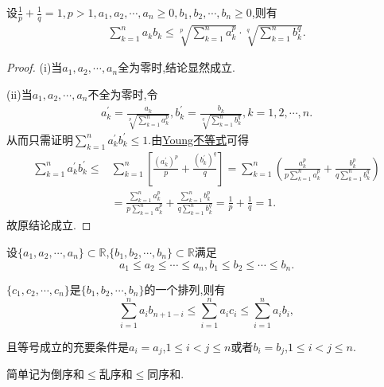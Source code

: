 \documentclass[../../main.tex]{subfiles}
\begin{document}
\begin{theorem}[Hold不等式]\label{theorem:Hold不等式}
设$\frac{1}{p}+\frac{1}{q}=1,p>1,a_1,a_2,\cdots,a_n\geqslant 0,b_1,b_2,\cdots,b_n\geqslant 0$,则有
\begin{align*}
\sum\limits_{k=1}^n{a_kb_k}\le \sqrt[p]{\sum\limits_{k=1}^n{a_{k}^{p}}}\cdot \sqrt[q]{\sum\limits_{k=1}^n{b_{k}^{q}}}.
\end{align*}
\end{theorem}
\begin{proof}
(i)当$a_1,a_2,\cdots,a_n$全为零时,结论显然成立.

(ii)当$a_1,a_2,\cdots,a_n$不全为零时,令
\begin{align*}
a_{k}^{\prime}=\frac{a_k}{\sqrt[p]{\sum\limits_{k=1}^n{a_{k}^{p}}}},b_{k}^{\prime}=\frac{b_k}{\sqrt[q]{\sum\limits_{k=1}^n{b_{k}^{q}}}},k=1,2,\cdots,n.
\end{align*}
从而只需证明$\sum\limits_{k=1}^n{a_{k}^{\prime}b_{k}^{\prime}}\leqslant 1$.由\hyperref[theorem:Young不等式]{Young不等式}可得
\begin{align*}
\sum\limits_{k=1}^n{a_{k}^{\prime}b_{k}^{\prime}}\leqslant &\sum\limits_{k=1}^n{\left[ \frac{\left( a_{k}^{\prime} \right) ^p}{p}+\frac{\left( b_{k}^{\prime} \right) ^q}{q} \right]}=\sum\limits_{k=1}^n{\left( \frac{a_{k}^{p}}{p\sum\limits_{k=1}^n{a_{k}^{p}}}+\frac{b_{k}^{p}}{q\sum\limits_{k=1}^n{b_{k}^{q}}} \right)}
\\
&=\frac{\sum\limits_{k=1}^n{a_{k}^{p}}}{p\sum\limits_{k=1}^n{a_{k}^{p}}}+\frac{\sum\limits_{k=1}^n{b_{k}^{p}}}{q\sum\limits_{k=1}^n{b_{k}^{q}}}=\frac{1}{p}+\frac{1}{q}=1.
\end{align*}
故原结论成立.
\end{proof}

\begin{theorem}[排序和不等式]\label{theorem:排序和不等式}
设\(\{a_1,a_2,\cdots,a_n\} \subset \mathbb{R}\),\(\{b_1,b_2,\cdots,b_n\} \subset \mathbb{R}\)满足
\[
a_1 \leqslant  a_2 \leqslant  \cdots \leqslant  a_n, b_1 \leqslant  b_2 \leqslant  \cdots \leqslant  b_n.
\]

\(\{c_1,c_2,\cdots,c_n\}\)是\(\{b_1,b_2,\cdots,b_n\}\)的一个排列,则有
\[
\sum\limits_{i = 1}^{n} a_i b_{n + 1 - i} \leqslant  \sum\limits_{i = 1}^{n} a_i c_i \leqslant  \sum\limits_{i = 1}^{n} a_i b_i,
\]

且等号成立的充要条件是\(a_i = a_j\),\(1 \leqslant  i < j \leqslant  n\)或者\(b_i = b_j\),\(1 \leqslant  i < j \leqslant  n\).
\end{theorem}
\begin{note}
简单记为倒序和\(\leqslant \)乱序和\(\leqslant \)同序和.
\end{note}
\end{document}
